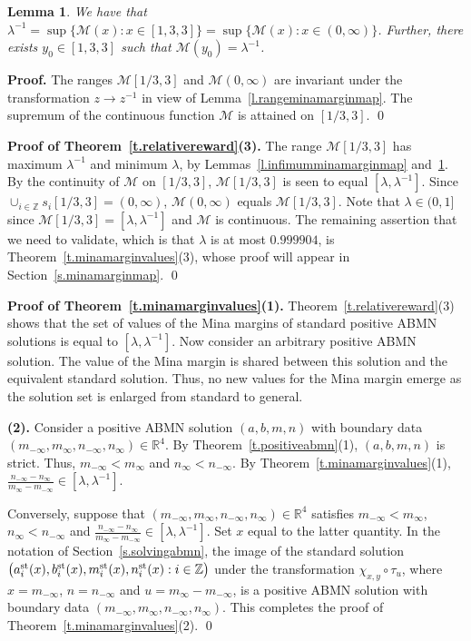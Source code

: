 \documentclass[letterpaper,11pt,oneside,reqno]{amsbook}
\newcommand{\R}{\ensuremath{\mathbb{R}}}
\newcommand{\Z}{\ensuremath{\mathbb{Z}}}
\numberwithin{figure}{chapter}
\newtheorem{lemma}[theorem]{Lemma}
\theoremstyle{definition}
\theoremstyle{definition}
\theoremstyle{definition}
\theoremstyle{definition}
\theoremstyle{definition}
\newcommand{\asta}{a^{\rm st}}
\newcommand{\bst}{b^{\rm st}}
\newcommand{\mst}{m^{\rm st}}
\newcommand{\nst}{n^{\rm st}}
\newcommand{\minamm}{\mathcal{M}}
\newcommand{\transmap}{\chi}
\newcommand{\abmnmacspace}{\textrm{ABMN} }
\begin{document}
\begin{lemma}\label{l.supremumminamarginmap}
 We have that $\lambda^{-1} = \sup \{ \minamm(x): x \in [1,3,3] \} =  \sup \{ \minamm(x): x \in (0,\infty) \}$.
Further, there exists $y_0 \in [1,3,3]$ such that $\minamm(y_0) = \lambda^{-1}$.
\end{lemma}
{\bf Proof.} The ranges $\minamm[1/3,3]$ and $\minamm(0,\infty)$ are invariant under the transformation $z \to z^{-1}$ in view of Lemma~\ref{l.rangeminamarginmap}.
The supremum of the continuous function $\minamm$ is attained on $[1/3,3]$.
 \qed



{\bf Proof of Theorem~\ref{t.relativereward}(3).} 
The range $\minamm[1/3,3]$ has maximum $\lambda^{-1}$ and minimum $\lambda$, by Lemmas~\ref{l.infimumminamarginmap} and~\ref{l.supremumminamarginmap}. By the continuity of $\minamm$ on $[1/3,3]$,
$\minamm[1/3,3]$ is seen to equal $[\lambda,\lambda^{-1}]$. Since  $\cup_{i \in \Z} s_i[1/3,3] = (0,\infty)$, $\minamm(0,\infty)$ equals $\minamm[1/3,3]$. Note that $\lambda \in (0,1]$ since $\minamm[1/3,3] = [\lambda,\lambda^{-1}]$
and $\minamm$ is continuous. The remaining assertion that we need to validate, which is that $\lambda$ is at most $0.999904$, is Theorem~\ref{t.minamarginvalues}(3), whose proof will appear in Section~\ref{s.minamarginmap}. \qed

{\bf Proof of Theorem~\ref{t.minamarginvalues}(1).}
Theorem~\ref{t.relativereward}(3) shows that the set of values of the Mina margins of standard positive \abmnmacspace solutions is equal to $[\lambda,\lambda^{-1}]$.
Now consider an arbitrary positive \abmnmacspace solution. The value of the Mina margin is shared between this solution and the equivalent standard solution. Thus, no new values for the Mina margin emerge as the solution set is enlarged from standard to general. 

{\bf (2).} Consider a positive \abmnmacspace solution $(a,b,m,n)$ with boundary data $(m_{-\infty},m_\infty,n_{-\infty},n_\infty) \in \R^4$. By Theorem~\ref{t.positiveabmn}(1), $(a,b,m,n)$ is strict. Thus, $m_{-\infty} < m_\infty$ and $n_\infty < n_{-\infty}$. By Theorem~\ref{t.minamarginvalues}(1), $\tfrac{n_{-\infty} - n_\infty}{m_\infty - m_{-\infty}} \in [\lambda,\lambda^{-1}]$.

Conversely, suppose that $(m_{-\infty},m_\infty,n_{-\infty},n_\infty) \in \R^4$ satisfies $m_{-\infty} < m_\infty$, $n_\infty < n_{-\infty}$ and $\tfrac{n_{-\infty} - n_\infty}{m_\infty - m_{-\infty}} \in [\lambda,\lambda^{-1}]$. Set $x$ equal to the latter quantity. In the notation of Section~\ref{s.solvingabmn}, the image of the standard solution $\big( \asta_i(x),\bst_i(x),\mst_i(x),\nst_i(x) : i \in \Z \big)$
under the transformation $\transmap_{x,y} \circ \tau_u$,  where $x = m_{-\infty}$, $n = n_{-\infty}$ and $u = m_\infty - m_{-\infty}$,
is a positive \abmnmacspace solution with boundary data  $(m_{-\infty},m_\infty,n_{-\infty},n_\infty)$.  This completes the proof of  Theorem~\ref{t.minamarginvalues}(2). \qed
\end{document}
